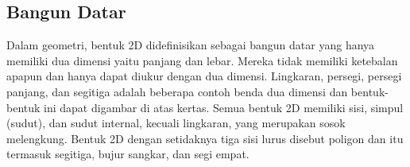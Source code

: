 
\subsection{Bangun Datar}
Dalam geometri, bentuk 2D didefinisikan sebagai bangun datar yang hanya memiliki dua dimensi yaitu panjang dan lebar. Mereka tidak memiliki ketebalan apapun dan hanya dapat diukur dengan dua dimensi. Lingkaran, persegi, persegi panjang, dan segitiga adalah beberapa contoh benda dua dimensi dan bentuk-bentuk ini dapat digambar di atas kertas. Semua bentuk 2D memiliki sisi, simpul (sudut), dan sudut internal, kecuali lingkaran, yang merupakan sosok melengkung. Bentuk 2D dengan setidaknya tiga sisi lurus disebut poligon dan itu termasuk segitiga, bujur sangkar, dan segi empat.


